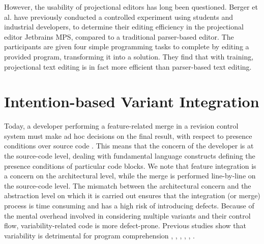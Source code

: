
However, the usability of projectional editors has long been questioned. Berger et al. \cite{berger2016mps} have previously conducted a controlled experiment using students and industrial developers, to determine their editing efficiency in the projectional editor Jetbrains MPS, compared to a traditional parser-based editor. The participants are given four simple programming tasks to complete by editing a provided program, transforming it into a solution. They find that with training, projectional text editing is in fact more efficient than parser-based text editing.



\section{Intention-based Variant Integration}
Today, a developer performing a feature-related merge in a revision control system must make ad hoc decisions on the final result, with respect to presence conditions over source code \cite{stanciulescu2016concepts}. This means that the concern of the developer is at the source-code level, dealing with fundamental language constructs defining the presence conditions of particular code blocks. We note that feature integration is a concern on the architectural level, while the merge is performed line-by-line on the source-code level. The mismatch between the architectural concern and the abstraction level on which it is carried out ensures that the integration (or merge) process is time consuming and has a high risk of introducing defects. Because of the mental overhead involved in considering multiple variants and their control flow, variability-related code is more defect-prone. Previous studies show that variability is detrimental for program comprehension \cite{melo2016latin}, \cite{favre1997understanding}, \cite{ernst2002preprocessor}, \cite{abal2014variability}, \cite{medeiros2015preprocessor}, \cite{medeiros2013syntaxerrors}.

